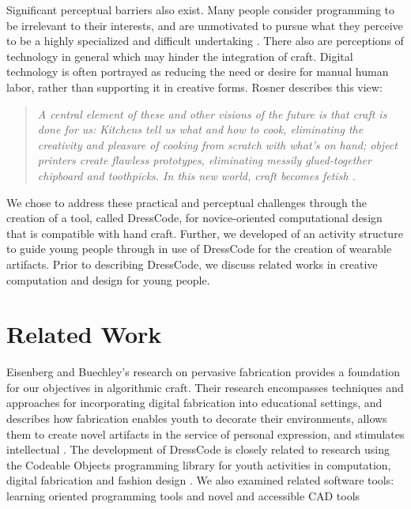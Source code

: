 \documentclass{sigchi}
\begin{document}
Significant perceptual barriers also exist. Many people consider programming to be irrelevant to their interests, and are unmotivated to pursue what they perceive to be a highly specialized and difficult undertaking \cite{resnick1}. There also are perceptions of technology in general which may hinder the integration of craft. Digital technology is often portrayed as reducing the need or desire for manual human labor, rather than supporting it in creative forms. Rosner describes this view:

\begin{quotation}
 \textit{A central element of these and other visions of the future is that craft is done for us: Kitchens tell us what and how to cook, eliminating the creativity and pleasure of cooking from scratch with what's on hand; object printers create flawless prototypes, eliminating messily glued-together chipboard and toothpicks. In this new world, craft becomes fetish \cite{rosner_craft_vs_design}.}
\end{quotation}

We chose to address these practical and perceptual challenges through the creation of a tool, called DressCode, for novice-oriented computational design that is compatible with hand craft. Further, we developed of an activity structure to guide young people through in use of DressCode for the creation of wearable artifacts. Prior to describing DressCode, we discuss related works in creative computation and design for young people.

\section{Related Work}
Eisenberg and Buechley's research on pervasive fabrication provides a foundation for our objectives in algorithmic craft. Their research encompasses techniques and approaches for incorporating digital fabrication into educational settings, and describes how fabrication enables youth to decorate their environments, allows them to create novel artifacts in the service of personal expression, and stimulates intellectual  \cite{pervasive_fab}. The development of DressCode is closely related to research using the Codeable Objects programming library for youth activities in computation, digital fabrication and fashion design \cite{codeable_objects}. We also examined related software tools: learning oriented programming tools and novel and accessible CAD tools
\end{document}
